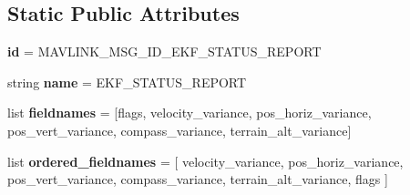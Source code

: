 \subsection*{Static Public Attributes}
\begin{DoxyCompactItemize}
\item 
\mbox{\label{classpymavlink_1_1dialects_1_1v10_1_1MAVLink__ekf__status__report__message_a8f5b8564374157074c4f4a2f7a237a6a}} 
{\bfseries id} = M\+A\+V\+L\+I\+N\+K\+\_\+\+M\+S\+G\+\_\+\+I\+D\+\_\+\+E\+K\+F\+\_\+\+S\+T\+A\+T\+U\+S\+\_\+\+R\+E\+P\+O\+RT
\item 
\mbox{\label{classpymavlink_1_1dialects_1_1v10_1_1MAVLink__ekf__status__report__message_a0bbe69a512a59a8ba2de7a21117a125a}} 
string {\bfseries name} = \textquotesingle{}E\+K\+F\+\_\+\+S\+T\+A\+T\+U\+S\+\_\+\+R\+E\+P\+O\+RT\textquotesingle{}
\item 
\mbox{\label{classpymavlink_1_1dialects_1_1v10_1_1MAVLink__ekf__status__report__message_aa3543733bfe2ad1c449300e6d0e65c43}} 
list {\bfseries fieldnames} = \mbox{[}\textquotesingle{}flags\textquotesingle{}, \textquotesingle{}velocity\+\_\+variance\textquotesingle{}, \textquotesingle{}pos\+\_\+horiz\+\_\+variance\textquotesingle{}, \textquotesingle{}pos\+\_\+vert\+\_\+variance\textquotesingle{}, \textquotesingle{}compass\+\_\+variance\textquotesingle{}, \textquotesingle{}terrain\+\_\+alt\+\_\+variance\textquotesingle{}\mbox{]}
\item 
\mbox{\label{classpymavlink_1_1dialects_1_1v10_1_1MAVLink__ekf__status__report__message_a8a14bc03fb02ec68731ac4ee1c5d38ad}} 
list {\bfseries ordered\+\_\+fieldnames} = \mbox{[} \textquotesingle{}velocity\+\_\+variance\textquotesingle{}, \textquotesingle{}pos\+\_\+horiz\+\_\+variance\textquotesingle{}, \textquotesingle{}pos\+\_\+vert\+\_\+variance\textquotesingle{}, \textquotesingle{}compass\+\_\+variance\textquotesingle{}, \textquotesingle{}terrain\+\_\+alt\+\_\+variance\textquotesingle{}, \textquotesingle{}flags\textquotesingle{} \mbox{]}
\item 
\mbox{\label{classpymavlink_1_1dialects_1_1v10_1_1MAVLink__ekf__status__report__message_a57a7b8aaa2b0aafcf403e8db5add1884}} 

\end{DoxyCompactItemize}
